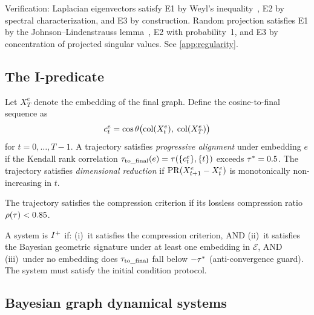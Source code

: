 \documentclass{../shared/primo}
\begin{document}
Verification: Laplacian eigenvectors satisfy E1 by Weyl's inequality~\cite{weyl1912asymptotische}, E2 by spectral characterization, and E3 by construction. Random projection satisfies E1 by the Johnson--Lindenstrauss lemma~\cite{johnson1984extensions}, E2 with probability~1, and E3 by concentration of projected singular values. See \cref{app:regularity}.

\subsection{The I-predicate}

\begin{definition}\label{def:bgs}
Let $X_T^e$ denote the embedding of the final graph. Define the cosine-to-final sequence as
\[
c_t^e = \cos\theta\bigl(\operatorname{col}(X_t^e),\; \operatorname{col}(X_T^e)\bigr)
\]
for $t = 0, \ldots, T{-}1$. A trajectory satisfies \emph{progressive alignment} under embedding $e$ if the Kendall rank correlation $\tau_{\mathrm{to\_final}}(e) = \tau(\{c_t^e\}, \{t\})$ exceeds $\tau^* = 0.5$. The trajectory satisfies \emph{dimensional reduction} if $\operatorname{PR}(X_{t+1}^e - X_t^e)$ is monotonically non-increasing in $t$.
\end{definition}

\begin{definition}\label{def:compression-b}
The trajectory satisfies the compression criterion if its lossless compression ratio $\rho(\tau) < 0.85$.
\end{definition}

\begin{definition}[$\Ipos$]\label{def:ipos-b}
A system is $\Ipos$ if: (i)~it satisfies the compression criterion, AND (ii)~it satisfies the Bayesian geometric signature under at least one embedding in $\mathcal{E}$, AND (iii)~under no embedding does $\tau_{\mathrm{to\_final}}$ fall below $-\tau^*$ (anti-convergence guard). The system must satisfy the initial condition protocol.
\end{definition}

\subsection{Bayesian graph dynamical systems}
\end{document}

